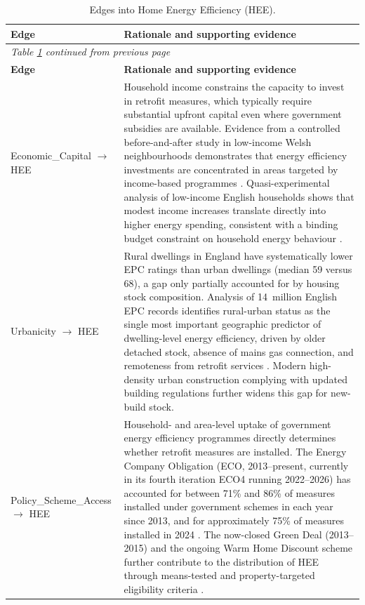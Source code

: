 \begin{longtable}{@{}p{3.5cm}p{11.5cm}@{}}
\caption{Edges into Home Energy Efficiency (HEE).}
\label{tab:edges-hee}\\
\toprule
\textbf{Edge} & \textbf{Rationale and supporting evidence} \\
\midrule
\endfirsthead
\multicolumn{2}{l}{\textit{Table \ref{tab:edges-hee} continued from previous page}}\\
\toprule
\textbf{Edge} & \textbf{Rationale and supporting evidence} \\
\midrule
\endhead
\bottomrule
\endfoot
Economic\_Capital $\to$ HEE & Household income constrains the capacity to invest in retrofit measures, which typically require substantial upfront capital even where government subsidies are available. Evidence from a controlled before-and-after study in low-income Welsh neighbourhoods demonstrates that energy efficiency investments are concentrated in areas targeted by income-based programmes \citep{grey_short-term_2017}. Quasi-experimental analysis of low-income English households shows that modest income increases translate directly into higher energy spending, consistent with a binding budget constraint on household energy behaviour \citep{galvin_juggling_2024}. \\
\addlinespace
Urbanicity $\to$ HEE & Rural dwellings in England have systematically lower EPC ratings than urban dwellings (median 59 versus 68), a gap only partially accounted for by housing stock composition. Analysis of 14~million English EPC records identifies rural-urban status as the single most important geographic predictor of dwelling-level energy efficiency, driven by older detached stock, absence of mains gas connection, and remoteness from retrofit services \citep{sheridan_energy_2023, office_for_national_statistics_energy_2025}. Modern high-density urban construction complying with updated building regulations further widens this gap for new-build stock. \\
\addlinespace
Policy\_Scheme\_Access $\to$ HEE & Household- and area-level uptake of government energy efficiency programmes directly determines whether retrofit measures are installed. The Energy Company Obligation (ECO, 2013--present, currently in its fourth iteration ECO4 running 2022--2026) has accounted for between 71\% and 86\% of measures installed under government schemes in each year since 2013, and for approximately 75\% of measures installed in 2024 \citep{department_for_energy_security_and_net_zero_household_2025}. The now-closed Green Deal (2013--2015) \citep{rosenow_post_2016} and the ongoing Warm Home Discount scheme further contribute to the distribution of HEE through means-tested and property-targeted eligibility criteria \citep{penasco_policy_2024}. \\

\end{longtable}
